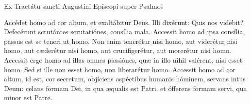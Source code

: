 
Ex Tractátu sancti Augustíni Epíscopi super Psalmos

Accédet homo ad cor altum, et exaltábitur Deus. Illi dixérunt: Quis nos videbit? Defecérunt scrutántes scrutatiónes, consília mala. Accessit homo ad ipsa consília, passus est se teneri ut homo. Non enim tenerétur nisi homo, aut viderétur nisi homo, aut cæderétur nisi homo, aut crucifigerétur, aut morerétur nisi homo. Accessit ergo homo ad illas omnes passiónes, quæ in illo nihil valérent, nisi esset homo. Sed si ille non esset homo, non liberarétur homo. Accessit homo ad cor altum, id est, cor secretum, objíciens aspéctibus humanis hóminem, servans intus Deum: celans formam Dei, in qua æqualis est Patri, et ófferens formam servi, qua minor est Patre.
\par